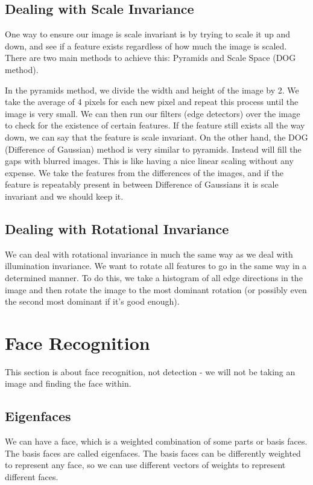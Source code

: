 \documentclass{article}
\begin{document}
	\subsection{Dealing with Scale Invariance}
	 One way to ensure our image is scale invariant is by trying to scale it up and down, and see if a feature exists regardless of how much the image is scaled. There are two main methods to achieve this: Pyramids and Scale Space (DOG method). 
	
	\par	 
	 In the pyramids method, we divide the width and height of the image by 2. We take the average of 4 pixels for each new pixel and repeat this process until the image is very small. We can then run our filters (edge detectors) over the image to check for the existence of certain features. If the feature still exists all the way down, we can say that the feature is scale invariant. On the other hand, the DOG (Difference of Gaussian) method is very similar to pyramids. Instead will fill the gaps with blurred images. This is like having a nice linear scaling without any expense. We take the features from the differences of the images, and if the feature is repeatably present in between Difference of Gaussians it is scale invariant and we should keep it.
	
	\subsection{Dealing with Rotational Invariance}
		We can deal with rotational invariance in much the same way as we deal with illumination invariance. We want to rotate all features to go in the same way in a determined manner. To do this, we take a histogram of all edge directions in the image and then rotate the image to the most dominant rotation (or possibly even the second most dominant if it's good enough).
		
	\section{Face Recognition}
	This section is about face recognition, not detection - we will not be taking an image and finding the face within.
	
	\subsection{Eigenfaces}
	We can have a face, which is a weighted combination of some parts or basis faces. The basis faces are called eigenfaces. The basis faces can be differently weighted to represent any face, so we can use different vectors of weights to represent different faces.
	
\end{document}
